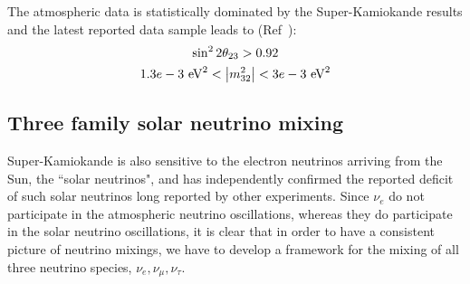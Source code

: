 The atmospheric data is statistically dominated by the Super-Kamiokande results and the latest reported data sample leads to (Ref~):
\begin{equation}
    \begin{gathered}
        \sin^2 2 \theta _{23} > 0.92 \\
    1.3e-3 ~\mathrm{eV}^2 < \abs{m_{32}^2} < 3e-3 ~\mathrm{eV}^2
    \end{gathered}
\end{equation}

\subsection{Three family solar neutrino mixing}
Super-Kamiokande is also sensitive to the electron neutrinos arriving from the Sun, the ``solar neutrinos", and has independently confirmed the reported deficit of such solar neutrinos long reported by other experiments.
Since \(\nu _e\) do not participate in the atmospheric neutrino oscillations, whereas they do participate in the solar neutrino oscillations, it is clear that in order to have a consistent picture of neutrino mixings, we have to develop a framework for the mixing of all three neutrino species, \(\nu _e, \nu _\mu, \nu _\tau \). 

